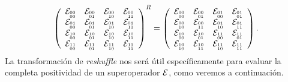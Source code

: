 \begin{align}
\left(
\begin{array}{cccc}
 \mathcal{E}_{{{}^{00}_{00}}} & \mathcal{E}_{{{}^{00}_{01}}} & \mathcal{E}_{{{}^{00}_{10}}} & \mathcal{E}_{{{}^{00}_{11}}} \\
 \mathcal{E}_{{{}^{01}_{00}}} & \mathcal{E}_{{{}^{01}_{01}}} & \mathcal{E}_{{{}^{01}_{10}}} & \mathcal{E}_{{{}^{01}_{11}}} \\
 \mathcal{E}_{{{}^{10}_{00}}} & \mathcal{E}_{{{}^{10}_{01}}} & \mathcal{E}_{{{}^{10}_{10}}} & \mathcal{E}_{{{}^{10}_{11}}} \\
 \mathcal{E}_{{{}^{11}_{00}}} & \mathcal{E}_{{{}^{11}_{01}}} & \mathcal{E}_{{{}^{11}_{10}}} & \mathcal{E}_{{{}^{11}_{11}}} \\
\end{array}
\right)^R
=
\left(
\begin{array}{cccc}
 \mathcal{E}_{{{}^{00}_{00}}} & \mathcal{E}_{{{}^{00}_{01}}} & \mathcal{E}_{{{}^{01}_{00}}} & \mathcal{E}_{{{}^{01}_{01}}} \\
 \mathcal{E}_{{{}^{00}_{10}}} & \mathcal{E}_{{{}^{00}_{11}}} & \mathcal{E}_{{{}^{01}_{10}}} & \mathcal{E}_{{{}^{01}_{11}}} \\
 \mathcal{E}_{{{}^{10}_{00}}} & \mathcal{E}_{{{}^{10}_{01}}} & \mathcal{E}_{{{}^{11}_{00}}} & \mathcal{E}_{{{}^{11}_{01}}} \\
 \mathcal{E}_{{{}^{10}_{10}}} & \mathcal{E}_{{{}^{10}_{11}}} & \mathcal{E}_{{{}^{11}_{10}}} & \mathcal{E}_{{{}^{11}_{11}}} \\
\end{array}
\right).
\end{align}
La transformación de \textit{reshuffle} nos será útil específicamente 
para evaluar la completa positividad de un superoperador $\mathcal{E}$, 
como veremos a continuación.

